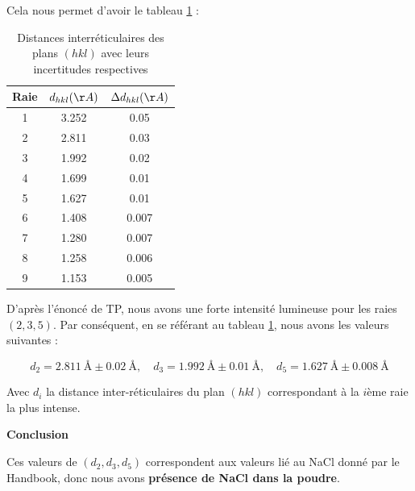 \newpage
Cela nous permet d'avoir le tableau \ref{tab:Tableau des dhkl correspondant aux différentes raies} :
\begin{table}[h!]
	\centering
	\begin{tabular}{|c|c|c|}
		
		\hline
	Raie &	$ d_{hkl} (\AA) $& $\Delta d_{hkl} (\AA)$  \\ \hline
	 1& 3.252	&         0.05                     \\ \hline
	2& 2.811	&      0.03                         \\ \hline
	3& 1.992	&       0.02                       \\ \hline
	4& 1.699	&         0.01                     \\ \hline
	5& 1.627	&        0.01                       \\ \hline
	6&1.408	&          0.007                     \\ \hline
	7& 1.280	&       0.007                        \\ \hline
	8& 1.258	&       0.006                        \\ \hline
	9& 1.153	&        0.005                       \\ \hline
	\end{tabular}
	\caption{Distances interréticulaires des plans $(h k l)$ avec leurs incertitudes respectives}
	\label{tab:Tableau des dhkl correspondant aux différentes raies}
\end{table}

D'après l'énoncé de TP, nous avons une forte intensité lumineuse pour les raies $(2, 3, 5)$. Par conséquent, en se référant au tableau \ref{tab:Tableau des dhkl correspondant aux différentes raies}, nous avons les valeurs suivantes :

\begin{equation} \label{eq:  distance inter-réticulaires et raies intenses}
	d_2 = 2.811 \ \text{Å} \pm 0.02 \ \text{Å}, \quad d_3 = 1.992 \ \text{Å} \pm 0.01 \ \text{Å}, \quad d_5 = 1.627 \ \text{Å} \pm 0.008 \ \text{Å}
\end{equation}

Avec $d_i$ la distance inter-réticulaires du plan $(hkl)$ correspondant à la $i$ème raie la plus intense.
\begin{flushleft}
	\textbf{Conclusion}
\end{flushleft}

Ces valeurs de $(d_2, d_3, d_5)$ correspondent aux valeurs lié au NaCl donné par le Handbook, donc nous avons\textbf{ présence de NaCl dans la poudre}.

